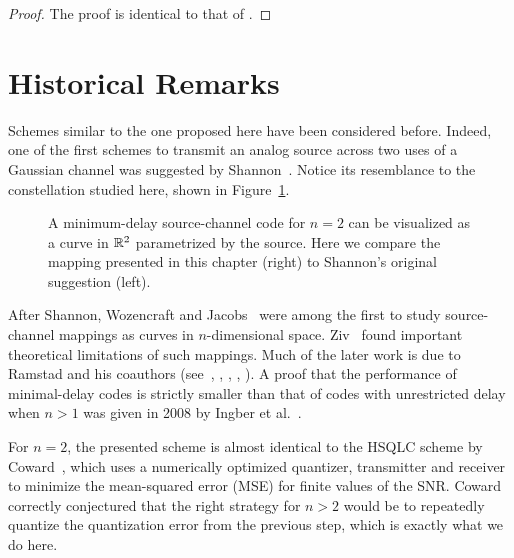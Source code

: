 \begin{proof}
  The proof is identical to that of .
\end{proof}








\section{Historical Remarks}

Schemes similar to the one proposed here have been considered before. Indeed,
one of the first schemes to transmit an analog source across two uses of a
Gaussian channel was suggested by Shannon~\cite{Shannon1949}. Notice its
resemblance to the constellation studied here, shown in
Figure~\ref{fig:shannoncomparison}.
\begin{figure}
  \centerline{
  \hfil
  \subfloat[Mapping proposed in this paper
  (for~$n=2$).]{} }%
  \caption{A minimum-delay source-channel code for $n=2$ can be visualized as a
  curve in $\mathbb{R}^2$ parametrized by the source. Here we compare the mapping
  presented in this chapter (right) to Shannon's original suggestion (left).}
  \label{fig:shannoncomparison}
\end{figure}

After Shannon, Wozencraft and Jacobs~\cite{WozencraftJ1965} were among the first
to study source-channel mappings as curves in $n$-dimensional space.
Ziv~\cite{Ziv1970} found important theoretical limitations of such mappings.
Much of the later work is due to Ramstad and his coauthors
(see~\cite{Ramstad2002}, \cite{FloorR2006}, \cite{CowardR2000,CowardR2000a},
\cite{WernerssonSR2007}, \cite{HeklandFR2009}). A proof that the performance of
minimal-delay codes is strictly smaller than that of codes with unrestricted
delay when $n>1$ was given in 2008 by Ingber et al.~\cite{IngberLZF2008}.

For $n=2$, the presented scheme is almost identical to the HSQLC scheme by
Coward~\cite{Coward2001}, which uses a numerically optimized quantizer,
transmitter and receiver to minimize the mean-squared error (MSE) for finite
values of the SNR. Coward correctly conjectured that the right strategy for $n >
2$ would be to repeatedly quantize the quantization error from the previous
step, which is exactly what we do here.

